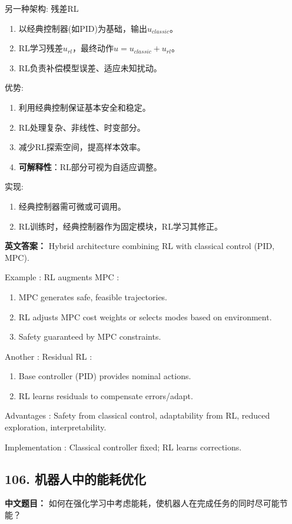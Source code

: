\documentclass[10pt,a4paper]{ctexart}
\begin{document}
 另一种架构: 残差RL 
\begin{enumerate}
    \item 以经典控制器(如PID)为基础，输出\(u_{classic}\)。
    \item RL学习残差\(u_{rl}\)，最终动作\(u = u_{classic} + u_{rl}\)。
    \item RL负责补偿模型误差、适应未知扰动。
\end{enumerate}

 优势:
\begin{enumerate}
    \item 利用经典控制保证基本安全和稳定。
    \item RL处理复杂、非线性、时变部分。
    \item 减少RL探索空间，提高样本效率。
    \item \textbf{可解释性}：RL部分可视为自适应调整。
\end{enumerate}

 实现:
\begin{enumerate}
    \item 经典控制器需可微或可调用。
    \item RL训练时，经典控制器作为固定模块，RL学习其修正。
\end{enumerate}

\textbf{英文答案：}  
Hybrid architecture combining RL with classical control (PID, MPC).

 Example :  RL augments MPC :
\begin{enumerate}
    \item MPC generates safe, feasible trajectories.
    \item RL adjusts MPC cost weights or selects modes based on environment.
    \item Safety guaranteed by MPC constraints.
\end{enumerate}

 Another :  Residual RL :
\begin{enumerate}
    \item Base controller (PID) provides nominal actions.
    \item RL learns residuals to compensate errors/adapt.
\end{enumerate}

 Advantages : Safety from classical control, adaptability from RL, reduced exploration, interpretability.

 Implementation : Classical controller fixed; RL learns corrections.

\subsection*{106. 机器人中的能耗优化}
\textbf{中文题目：} 如何在强化学习中考虑能耗，使机器人在完成任务的同时尽可能节能？
\end{document}
